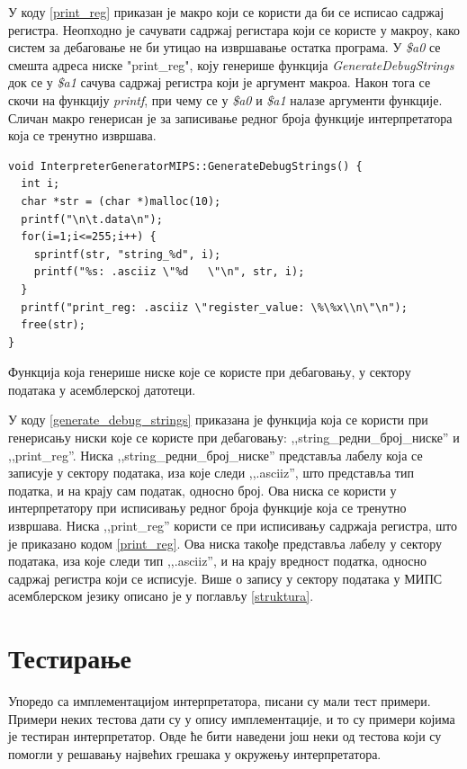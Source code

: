 \documentclass[12pt,oneside]{memoir}
\begin{document}
У коду \ref{print_reg} приказан је макро који се користи да би се исписао садржај регистра. Неопходно је сачувати садржај регистара који се користе у макроу, како систем за дебаговање не би утицао на извршавање остатка програма. У \textit{\$a0} се смешта адреса ниске "print\_reg", коју генерише функција \textit{GenerateDebugStrings} док се у \textit{\$a1} сачува садржај регистра који је аргумент макроа. Након тога се скочи на функцију \textit{printf}, при чему се у \textit{\$a0} и \textit{\$a1} налазе аргументи функције. Сличан макро генерисан је за записивање редног броја функције интерпретатора која се тренутно извршава.\\

\begin{listing}
\begin{verbatim}
void InterpreterGeneratorMIPS::GenerateDebugStrings() {
  int i;
  char *str = (char *)malloc(10);
  printf("\n\t.data\n");
  for(i=1;i<=255;i++) {
    sprintf(str, "string_%d", i);
    printf("%s: .asciiz \"%d   \"\n", str, i);
  }
  printf("print_reg: .asciiz \"register_value: \%\%x\\n\"\n");
  free(str);
}
\end{verbatim}
\caption{Функција која генерише ниске које се користе при дебаговању, у сектору података у асемблерској датотеци.}
\label{generate_debug_strings}
\end{listing}

У коду \ref{generate_debug_strings} приказана је функција која се користи при генерисању ниски које се користе при дебаговању: ,,string\_редни\_број\_ниске'' и ,,print\_reg''. Ниска  ,,string\_редни\_број\_ниске'' представља лабелу која се записује у сектору података, иза које следи ,,.asciiz'', што представља тип податка, и на крају сам податак, односно број. Ова ниска се користи у интерпретатору при исписивању редног броја функције која се тренутно извршава.
Ниска ,,print\_reg'' користи се при исписивању садржаја регистра, што је приказано кодом \ref{print_reg}. Ова ниска такође представља лабелу у сектору података, иза које следи тип ,,.asciiz'', и на крају вредност податка, односно садржај регистра који се исписује. Више о запису у сектору података у МИПС асемблерском језику описано је у поглављу \ref{struktura}.

\section{Тестирање}
\label{testiranje}
Упоредо са имплементацијом интерпретатора, писани су мали тест примери. Примери неких тестова дати су у опису имплементације, и то су примери којима је тестиран интерпретатор. Овде ће бити наведени још неки од тестова који су помогли у решавању највећих грешака у окружењу интерпретатора.
\end{document}

